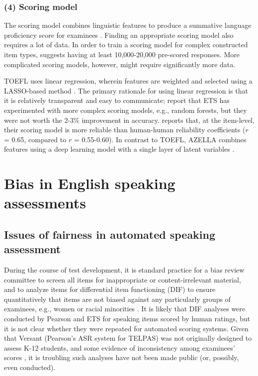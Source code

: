 \documentclass [PhD] {uclathes}
\begin{document}
\subsubsection{(4) Scoring model}

The scoring model combines linguistic features to produce a summative language proficiency score for examinees \citep{loukina2019scoring}. Finding an appropriate scoring model also requires a lot of data. In order to train a scoring model for complex constructed item types, \citet{zechner2019summary} suggests having at least 10,000-20,000 pre-scored responses. More complicated scoring models, however, might require significantly more data.

TOEFL uses linear regression, wherein features are weighted and selected using a LASSO-based method \citep{loukina2015feature}. The primary rationale for using linear regression is that it is relatively transparent and easy to communicate; \citet{loukina2019scoring} report that ETS has experimented with more complex scoring models, e.g., random forests, but they were not worth the 2-3\% improvement in accuracy. \citet{zechner2019summary} reports that, at the item-level, their scoring model is more reliable than human-human reliability coefficients ($r$ = 0.65, compared to $r$ = 0.55-0.60). In contrast to TOEFL, AZELLA combines features using a deep learning model with a single layer of latent variables \citep{cheng2014automatic}.

\section{Bias in English speaking assessments}

\subsection{Issues of fairness in automated speaking assessment}

During the course of test development, it is standard practice for a bias review committee to screen all items for inappropriate or content-irrelevant material, and to analyze items for differential item functioning (DIF) to ensure quantitatively that items are not biased against any particularly groups of examinees, e.g., women or racial minorities \citep{aera2014}. It is likely that DIF analyses were conducted by Pearson and ETS for speaking items scored by human ratings, but it is not clear whether they were repeated for automated scoring systems. Given that Versant (Pearson’s ASR system for TELPAS) was not originally designed to assess K-12 students, and some evidence of inconsistency among examinees’ scores \citep{collier2020test}, it is troubling such analyses have not been made public (or, possibly, even conducted).
\end{document}
